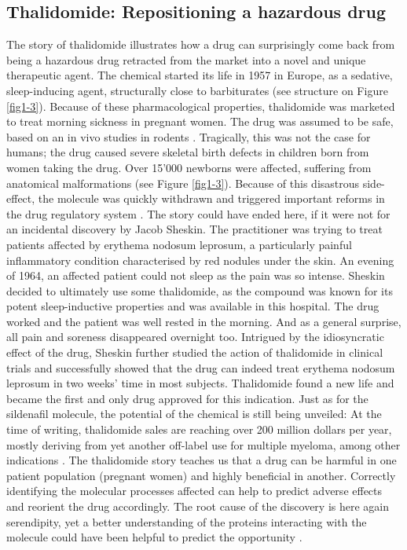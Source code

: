 \subsection{Thalidomide: Repositioning a hazardous drug}

The story of thalidomide illustrates how a drug can surprisingly come back from being a hazardous drug retracted from the market into a novel and unique therapeutic agent. The chemical started its life in 1957 in Europe, as a sedative, sleep-inducing agent, structurally close to barbiturates (see structure on Figure \ref{fig1-3}). Because of these pharmacological properties, thalidomide was marketed to treat morning sickness in pregnant women. The drug was assumed to be safe, based on an in vivo studies in rodents \citep{stephens2009dark}. Tragically, this was not the case for humans; the drug caused severe skeletal birth defects in children born from women taking the drug. Over 15’000 newborns were affected, suffering from anatomical malformations (see Figure \ref{fig1-3}). Because of this disastrous side-effect, the molecule was quickly withdrawn and triggered important reforms in the drug regulatory system \citep{stephens2009dark}. The story could have ended here, if it were not for an incidental discovery by Jacob Sheskin. The practitioner was trying to treat patients affected by erythema nodosum leprosum, a particularly painful inflammatory condition characterised by red nodules under the skin. An evening of 1964, an affected patient could not sleep as the pain was so intense. Sheskin decided to ultimately use some thalidomide, as the compound was known for its potent sleep-inductive properties and was available in this hospital. The drug worked and the patient was well rested in the morning. And as a general surprise, all pain and soreness disappeared overnight too. Intrigued by the idiosyncratic effect of the drug, Sheskin further studied the action of thalidomide in clinical trials \citep{barratt2012drug} and successfully showed that the drug can indeed treat erythema nodosum leprosum in two weeks' time in most subjects. Thalidomide found a new life and became the first and only drug approved for this indication. Just as for the sildenafil molecule, the potential of the chemical is still being unveiled: At the time of writing, thalidomide sales are reaching over 200 million dollars per year, mostly deriving from yet another off-label use for multiple myeloma, among other indications \cite{ashburn2004drug}. The thalidomide story teaches us that a drug can be harmful in one patient population (pregnant women) and highly beneficial in another. Correctly identifying the molecular processes affected can help to predict adverse effects and reorient the drug accordingly. The root cause of the discovery is here again serendipity, yet a better understanding of the proteins interacting with the molecule could have been helpful to predict the opportunity \citep{sampaio1991thalidomide}.

